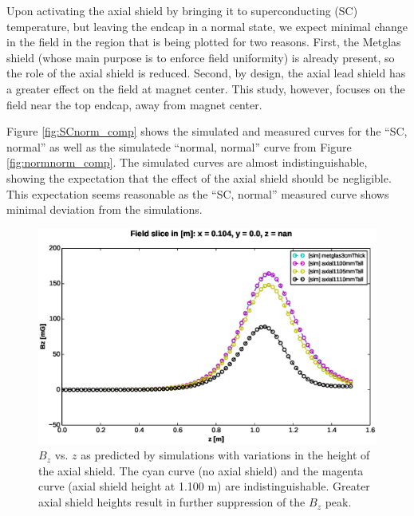 \documentclass[twocolumn,aps,prb,citeautoscript]{revtex4-1}
\begin{document}

Upon activating the axial shield by bringing it to superconducting (SC) temperature,
but leaving the endcap in a normal state, we expect minimal change in the field in the region that is being
plotted for two reasons. First, the Metglas shield (whose main purpose is to enforce field uniformity) is already
present, so the role of the axial shield is reduced. Second, by design, the axial lead shield has a greater effect on
the field at magnet center. This study, however, focuses on the field near the top endcap, away from magnet center.

Figure \ref{fig:SCnorm_comp}
shows the simulated and measured curves for the ``SC, normal'' as well as the
simulatede ``normal, normal'' curve
from Figure \ref{fig:normnorm_comp}. The simulated curves are almost indistinguishable,
showing the expectation that the effect of the axial shield should be negligible. This
expectation seems reasonable as the ``SC, normal'' measured curve shows minimal deviation from
the simulations.

\begin{figure}
    \includegraphics[width=\textwidth]{figures/axial_effect.eps}
    \caption{\label{fig:SCnorm_hd}$B_z$ vs. $z$ as predicted by simulations with variations in the height
    of the axial shield. The cyan curve (no axial shield) and the magenta curve (axial shield height at
    1.100 m) are indistinguishable. Greater axial shield heights result in further suppression of the
    $B_z$ peak.}
\end{figure}
\end{document}
